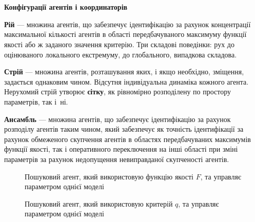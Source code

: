 \documentclass[14pt,handout,utf8]{beamer}
\newcommand{\Xhead}[1]{
 \begin{center}%
      \textbf{#1}%
 \end{center}%
}
\begin{document}
\begin{frame}
  \frametitle{~}

  \Xhead{Конфігурації агентів і координаторів}

\textbf{Рій} --- множина агентів, що забезпечує ідентифікацію за рахунок
концентрації максимальної кількості агентів в області передбачуваного максимуму
функції якості або ж заданого значення критерію. Три складові поведінки: рух
до оцінюваного локального екстремуму, до глобального, випадкова складова.

\textbf{Стрій} --- множина агентів, розташування яких, і якщо необхідно,
зміщення, задається однаковим чином. Відсутня індивідуальна динаміка кожного
агента. Нерухомий стрій утворює \textbf{сітку},
як рівномірно розподілену по простору параметрів, так і~ні.

\textbf {Ансамбль} ---
множина агентів, що забезпечує ідентифікацію за рахунок розподілу агентів таким
чином, який забезпечує як точність ідентифікації за рахунок обмеженого
скупчення агентів в областях передбачуваних максимумів функції якості, так і оперативного
переключення на інші області при зміні параметрів за рахунок недопущення
невиправданої скупченості агентів.

  \begin{figure}[htb!]
    \begin{center}
      
    \end{center}
    \caption{Пошуковий агент, який використовую функцію якості $F$, та управляє параметром однієї моделі}
    \label{atu:f:agent1}
  \end{figure}


  \begin{figure}[htb!]
    \begin{center}
      
    \end{center}
    \caption{Пошуковий агент, який використовую критерій $q$, та управляє параметром однієї моделі}
    \label{atu:f:agent1q}
  \end{figure}

\end{frame}


\end{document}
